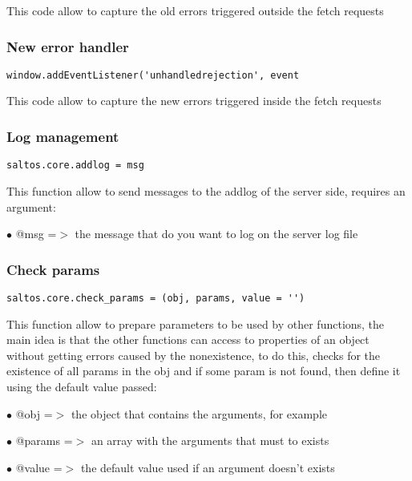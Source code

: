 \documentclass[a4paper]{article}
\begin{document}
This code allow to capture the old errors triggered outside the fetch requests

\hypertarget{toc694}{}
\subsubsection{New error handler}

\begin{lstlisting}
window.addEventListener('unhandledrejection', event
\end{lstlisting}

This code allow to capture the new errors triggered inside the fetch requests

\hypertarget{toc695}{}
\subsubsection{Log management}

\begin{lstlisting}
saltos.core.addlog = msg
\end{lstlisting}

This function allow to send messages to the addlog of the server side, requires an argument:

\begin{compactitem}
\item[\color{myblue}$\bullet$] @msg =$>$ the message that do you want to log on the server log file
\end{compactitem}

\hypertarget{toc696}{}
\subsubsection{Check params}

\begin{lstlisting}
saltos.core.check_params = (obj, params, value = '')
\end{lstlisting}

This function allow to prepare parameters to be used by other functions, the main idea
is that the other functions can access to properties of an object without getting errors
caused by the nonexistence, to do this, checks for the existence of all params in the obj
and if some param is not found, then define it using the default value passed:

\begin{compactitem}
\item[\color{myblue}$\bullet$] @obj    =$>$ the object that contains the arguments, for example
\item[\color{myblue}$\bullet$] @params =$>$ an array with the arguments that must to exists
\item[\color{myblue}$\bullet$] @value  =$>$ the default value used if an argument doesn't exists
\end{compactitem}
\end{document}
